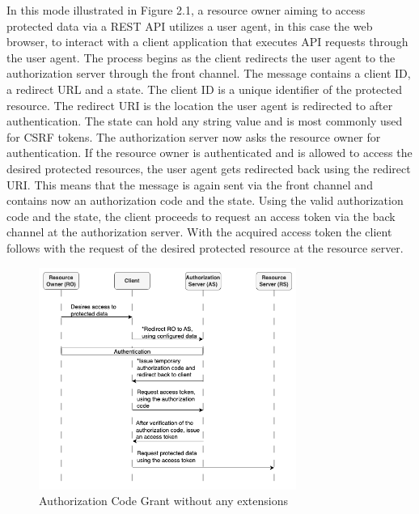 \documentclass[
    fontsize=12pt,
    headings=small,
    parskip=half,           %
    bibliography=totoc,
    numbers=noenddot,       %
    open=any,               %
    ]{scrreprt}
\begin{document}
In this mode illustrated in Figure 2.1, a resource owner aiming to access
protected data via a REST API utilizes a user agent, in this case the web
browser, to interact with a client application that executes API requests
through the user agent. The process begins as the client redirects the user
agent to the authorization server through the front channel. The message
contains a client ID, a redirect URL and a state. The client ID is a unique
identifier of the protected resource. The redirect URI is the location the user
agent is redirected to after authentication. The state can hold any string
value and is most commonly used for CSRF tokens. The authorization server now
asks the resource owner for authentication. If the resource owner is
authenticated and is allowed to access the desired protected resources, the
user agent gets redirected back using the redirect URI. This means that the
message is again sent via the front channel and contains now an authorization
code and the state. Using the valid authorization code and the state, the
client proceeds to request an access token via the back channel at the
authorization server. With the acquired access token the client follows with
the request of the desired protected resource at the resource server.

\begin{figure}[ht]
	\sffamily\footnotesize
	\includegraphics[width=0.75\textwidth]{pic/authorization_code_grant.png}
	\unitlength=0.75mm
	\linethickness{0.4pt}
	\caption{Authorization Code Grant without any extensions}
	\label{fig:auth_code_grant}
\end{figure}
\end{document}
